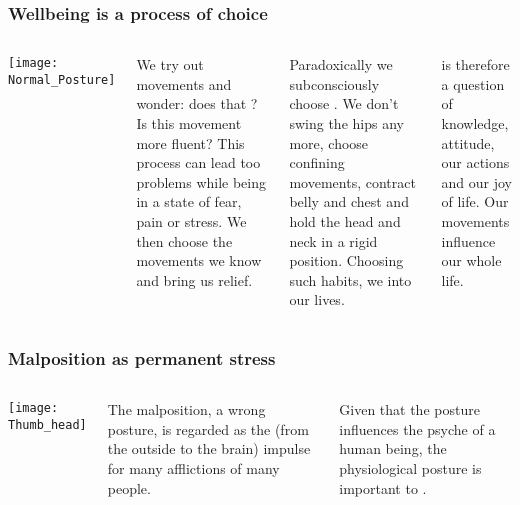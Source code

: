 \begin{frame}
\frametitle{Wellbeing is a process of choice}
\hypertarget{posture}{}
\begin{columns}[c] %


\texttt{[image: Normal\_Posture]}

We try out movements and wonder: does that ? Is this movement more fluent? This process can lead too problems while being in a state of fear, pain or stress.
We then choose the movements we know and bring us relief.

Paradoxically we subconsciously choose . We don't swing the hips any more, choose confining movements, contract belly and chest and hold the head and neck in a rigid position.
Choosing such habits, we  into our lives.

 is therefore a question of knowledge, attitude, our actions and our joy of life. Our movements influence our whole life.
\end{columns}

\end{frame}
\begin{frame}
\frametitle{Malposition as permanent stress}
\begin{columns}[c] %


\texttt{[image: Thumb\_head]}

The malposition, a wrong posture, is regarded as the  (from the outside to the brain) impulse for many afflictions of many people. 

Given that the posture influences the psyche of a human being, the physiological posture is important to . 
\end{columns}

\end{frame}
